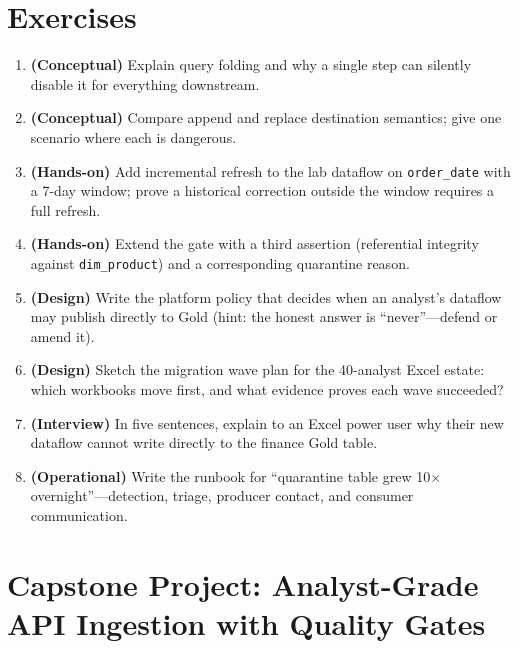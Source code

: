 \section{Exercises}
\begin{enumerate}
    \item \textbf{(Conceptual)} Explain query folding and why a single step can silently disable it for everything downstream.
    \item \textbf{(Conceptual)} Compare append and replace destination semantics; give one scenario where each is dangerous.
    \item \textbf{(Hands-on)} Add incremental refresh to the lab dataflow on \texttt{order\_date} with a 7-day window; prove a historical correction outside the window requires a full refresh.
    \item \textbf{(Hands-on)} Extend the gate with a third assertion (referential integrity against \texttt{dim\_product}) and a corresponding quarantine reason.
    \item \textbf{(Design)} Write the platform policy that decides when an analyst's dataflow may publish directly to Gold (hint: the honest answer is ``never''---defend or amend it).
    \item \textbf{(Design)} Sketch the migration wave plan for the 40-analyst Excel estate: which workbooks move first, and what evidence proves each wave succeeded?
    \item \textbf{(Interview)} In five sentences, explain to an Excel power user why their new dataflow cannot write directly to the finance Gold table.
    \item \textbf{(Operational)} Write the runbook for ``quarantine table grew 10$\times$ overnight''---detection, triage, producer contact, and consumer communication.
\end{enumerate}

\section{Capstone Project: Analyst-Grade API Ingestion with Quality Gates}\label{sec:ch10-capstone}

